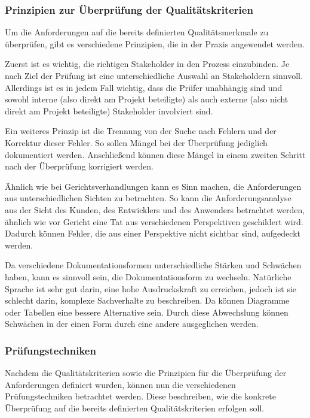\subsubsection{Prinzipien zur Überprüfung der Qualitätskriterien}
Um die Anforderungen auf die bereits definierten Qualitätsmerkmale zu überprüfen, gibt es verschiedene Prinzipien, die in der Praxis angewendet werden.

Zuerst ist es wichtig, die richtigen Stakeholder in den Prozess einzubinden.
Je nach Ziel der Prüfung ist eine unterschiedliche Auswahl an Stakeholdern sinnvoll.
Allerdings ist es in jedem Fall wichtig, dass die Prüfer unabhängig sind und sowohl interne (also direkt am Projekt beteiligte) als auch externe (also nicht direkt am Projekt beteiligte) Stakeholder involviert sind\autocite[vgl.][Seite 26]{Maulhardt.c}.

Ein weiteres Prinzip ist die Trennung von der Suche nach Fehlern und der Korrektur dieser Fehler.
So sollen Mängel bei der Überprüfung jediglich dokumentiert werden.
Anschließend können diese Mängel in einem zweiten Schritt nach der Überprüfung korrigiert werden\autocite[vgl.][Seite 26]{Maulhardt.c}.

Ähnlich wie bei Gerichtsverhandlungen kann es Sinn machen, die Anforderungen aus unterschiedlichen Sichten zu betrachten.
So kann die Anforderungsanalyse aus der Sicht des Kunden, des Entwicklers und des Anwenders betrachtet werden, ähnlich wie vor Gericht eine Tat aus verschiedenen Perspektiven geschildert wird.
Dadurch können Fehler, die aus einer Perspektive nicht sichtbar sind, aufgedeckt werden\autocite[vgl.][Seite 27]{Maulhardt.c}.

Da verschiedene Dokumentationsformen unterschiedliche Stärken und Schwächen haben, kann es sinnvoll sein, die Dokumentationsform zu wechseln.
Natürliche Sprache ist sehr gut darin, eine hohe Ausdruckskraft zu erreichen, jedoch ist sie schlecht darin, komplexe Sachverhalte zu beschreiben.
Da können Diagramme oder Tabellen eine bessere Alternative sein.
Durch diese Abwechslung können Schwächen in der einen Form durch eine andere ausgeglichen werden\autocite[vgl.][Seite 28]{Maulhardt.c}.

\subsubsection{Prüfungstechniken}
Nachdem die Qualitätskriterien sowie die Prinzipien für die Überprüfung der Anforderungen definiert wurden, können nun die verschiedenen Prüfungstechniken betrachtet werden.
Diese beschreiben, wie die konkrete Überprüfung auf die bereits definierten Qualitätskriterien erfolgen soll.

